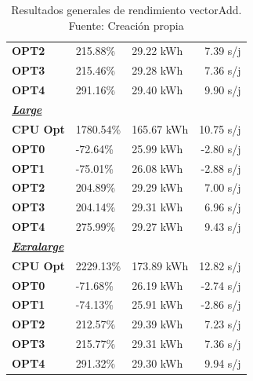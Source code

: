 \begin{table}[H]
\begin{tabular}{lllr}
    \cellcolor[HTML]{DAE8FC} \textbf{OPT2} & 215.88\%  &	29.22 kWh  &	7.39 s/j \\
    \rowcolor[HTML]{EFEFEF} \cellcolor[HTML]{DAE8FC} \textbf{OPT3} &215.46\%  &	29.28 kWh  &	7.36 s/j \\
    \cellcolor[HTML]{DAE8FC} \textbf{OPT4} & 291.16\%  &	29.40 kWh  &	9.90 s/j \\
    \rowcolor[HTML]{EFEFEF} \cellcolor[HTML]{DAE8FC} \textbf{\textbf{{\emph{{\underline{{Large}}}}}}} &&	&	 \\
    \cellcolor[HTML]{DAE8FC} \textbf{CPU Opt} & 1780.54\%  &	165.67 kWh  &	10.75 s/j \\
    \rowcolor[HTML]{EFEFEF} \cellcolor[HTML]{DAE8FC} \textbf{OPT0} &-72.64\%  &	25.99 kWh  &	-2.80 s/j \\
    \cellcolor[HTML]{DAE8FC} \textbf{OPT1} & -75.01\%  &	26.08 kWh  &	-2.88 s/j \\
    \rowcolor[HTML]{EFEFEF} \cellcolor[HTML]{DAE8FC} \textbf{OPT2} &204.89\%  &	29.29 kWh  &	7.00 s/j \\
    \cellcolor[HTML]{DAE8FC} \textbf{OPT3} & 204.14\%  &	29.31 kWh  &	6.96 s/j \\
    \rowcolor[HTML]{EFEFEF} \cellcolor[HTML]{DAE8FC} \textbf{OPT4} &275.99\%  &	29.27 kWh  &	9.43 s/j \\
    \cellcolor[HTML]{DAE8FC} \textbf{\textbf{{\emph{{\underline{{Exralarge}}}}}}} & &	&	 \\
    \rowcolor[HTML]{EFEFEF} \cellcolor[HTML]{DAE8FC} \textbf{CPU Opt} &2229.13\%  &	173.89 kWh  &	12.82 s/j \\
    \cellcolor[HTML]{DAE8FC} \textbf{OPT0} & -71.68\%  &	26.19 kWh  &	-2.74 s/j \\
    \rowcolor[HTML]{EFEFEF} \cellcolor[HTML]{DAE8FC} \textbf{OPT1} &-74.13\%  &	25.91 kWh  &	-2.86 s/j \\
    \cellcolor[HTML]{DAE8FC} \textbf{OPT2} & 212.57\%  &	29.39 kWh  &	7.23 s/j \\
    \rowcolor[HTML]{EFEFEF} \cellcolor[HTML]{DAE8FC} \textbf{OPT3} &215.77\%  &	29.31 kWh  &	7.36 s/j \\
    \cellcolor[HTML]{DAE8FC} \textbf{OPT4} & 291.32\%  &	29.30 kWh  &	9.94 s/j \\
    \end{tabular}
    \caption[Resultados generales de rendimiento vectorAdd]{{Resultados generales de rendimiento vectorAdd. Fuente: Creación propia}}
    \label{table_global_vectorAdd_PowerResults_speedup-energy}
\end{table}